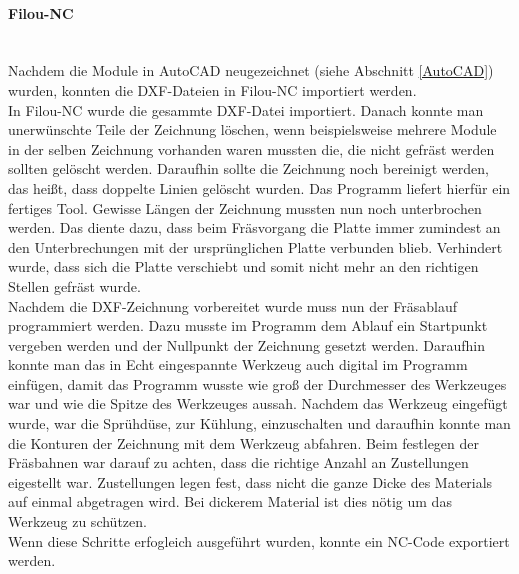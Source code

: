     \paragraph{Filou-NC}\mbox{}\\
    Nachdem die Module in AutoCAD neugezeichnet (siehe Abschnitt \ref{AutoCAD}) wurden, konnten die DXF-Dateien in Filou-NC importiert werden.\\
    In Filou-NC wurde die gesammte DXF-Datei importiert. Danach konnte man unerwünschte Teile der Zeichnung löschen, wenn beispielsweise mehrere Module in der selben Zeichnung vorhanden waren mussten die, die nicht gefräst werden sollten gelöscht werden. Daraufhin sollte die Zeichnung noch bereinigt werden, das heißt, dass doppelte Linien gelöscht wurden. Das Programm liefert hierfür ein fertiges Tool. Gewisse Längen der Zeichnung mussten nun noch unterbrochen werden. Das diente dazu, dass beim Fräsvorgang die Platte immer zumindest an den Unterbrechungen mit der ursprünglichen Platte verbunden blieb. Verhindert wurde, dass sich die Platte verschiebt und somit nicht mehr an den richtigen Stellen gefräst wurde.\\
    Nachdem die DXF-Zeichnung vorbereitet wurde muss nun der Fräsablauf programmiert werden. Dazu musste im Programm dem Ablauf ein Startpunkt vergeben werden und der Nullpunkt der Zeichnung gesetzt werden. Daraufhin konnte man das in Echt eingespannte Werkzeug auch digital im Programm einfügen, damit das Programm wusste wie groß der Durchmesser des Werkzeuges war und wie die Spitze des Werkzeuges aussah. Nachdem das Werkzeug eingefügt wurde, war die Sprühdüse, zur Kühlung, einzuschalten und daraufhin konnte man die Konturen der Zeichnung mit dem Werkzeug abfahren. Beim festlegen der Fräsbahnen war darauf zu achten, dass die richtige Anzahl an Zustellungen eigestellt war. Zustellungen legen fest, dass nicht die ganze Dicke des Materials auf einmal abgetragen wird. Bei dickerem Material ist dies nötig um das Werkzeug zu schützen.\\
    Wenn diese Schritte erfogleich ausgeführt wurden, konnte ein NC-Code exportiert werden. 
